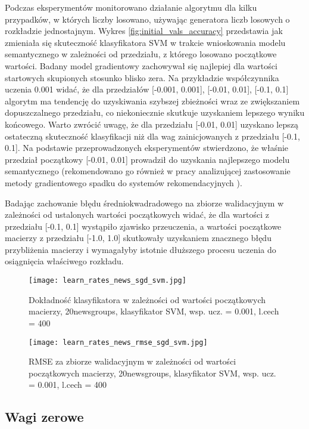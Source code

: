 \documentclass{pracamgr}
\begin{document}
Podczas eksperymentów monitorowano działanie algorytmu dla kilku przypadków, w których liczby losowano, używając generatora liczb losowych o rozkładzie jednostajnym. Wykres \ref{fig:initial_vals_accuracy} przedstawia jak zmieniała się skuteczność klasyfikatora SVM w trakcie wnioskowania modelu semantycznego w zależności od przedziału, z którego losowano początkowe wartości. Badany model gradientowy zachowywał się najlepiej dla wartości startowych skupionych stosunko blisko zera. Na przykładzie współczynnika uczenia 0.001 widać, że dla przedziałów [-0.001, 0.001], [-0.01, 0.01], [-0.1, 0.1] algorytm ma tendencję do uzyskiwania szybszej zbieżności wraz ze zwiększaniem dopuszczalnego przedziału, co niekoniecznie skutkuje uzyskaniem lepszego wyniku końcowego. Warto zwrócić uwagę, że dla przedziału [-0.01, 0.01] uzyskano lepszą ostateczną skuteczność klasyfikacji niż dla wag zainicjowanych z przedziału [-0.1, 0.1]. Na podstawie przeprowadzonych eksperymentów stwierdzono, że właśnie przedział początkowy [-0.01, 0.01] prowadził do uzyskania najlepszego modelu semantycznego (rekomendowano go również w pracy analizującej zastosowanie metody gradientowego spadku do systemów rekomendacyjnych \cite{takacs}).

Badając zachowanie błędu średniokwadradowego na zbiorze walidacyjnym w zależności od ustalonych wartości początkowych widać, że dla wartości z przedziału [-0.1, 0.1] wystąpiło zjawisko przeuczenia, a wartości początkowe macierzy z przedziału [-1.0, 1.0] skutkowały uzyskaniem znacznego błędu przybliżenia macierzy i wymagałyby istotnie dłuższego procesu uczenia do osiągnięcia właściwego rozkładu.

\begin{figure}[]
  \texttt{[image: learn\_rates\_news\_sgd\_svm.jpg]}
  \caption{Dokładność klasyfikatora w zależności od wartości początkowych macierzy, 20newsgroups, klasyfikator SVM, wsp. ucz. = 0.001, l.cech = 400}\label{fig:initial_vals_accuracy}
\endminipage\hfill
{}%
  \texttt{[image: learn\_rates\_news\_rmse\_sgd\_svm.jpg]}
  \caption{RMSE za zbiorze walidacyjnym w zależności od wartości początkowych macierzy, 20newsgroups, klasyfikator SVM, wsp. ucz. = 0.001, l.cech = 400}\label{fig:initial_vals_rmse}
\endminipage\hfill
\end{figure}

\subsection{Wagi zerowe}
\end{document}
